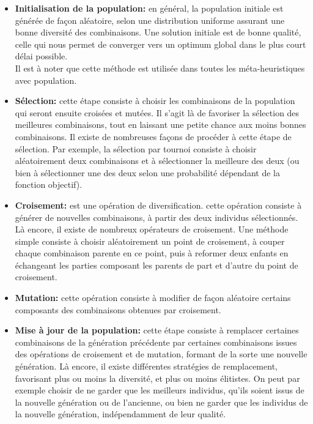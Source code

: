 \begin{enumerate}[label=\alph*)]
\begin{algorithm}[H]
\end{algorithm}

	
\begin{itemize}
	\item \textbf{Initialisation de la population: }en général, la population initiale est générée de façon aléatoire, selon une distribution uniforme assurant une bonne diversité des combinaisons. Une solution initiale est de bonne qualité, celle qui nous permet de converger vers un optimum global dans le plus court délai possible.\\
  Il est à noter que cette méthode est utilisée dans toutes les méta-heuristiques avec population.

	\item \textbf{Sélection: } cette étape consiste à choisir les combinaisons de la population qui seront ensuite croisées et mutées. Il s’agit là de favoriser la sélection des meilleures combinaisons, tout en laissant une petite chance aux moins bonnes combinaisons. Il existe de nombreuses façons de procéder à cette étape de sélection. Par exemple, la sélection par tournoi consiste à choisir aléatoirement deux combinaisons et à sélectionner la meilleure des deux (ou bien à sélectionner une des deux selon une probabilité dépendant de la fonction objectif).
	
	\item \textbf{Croisement:} est une opération de diversification. cette opération consiste à générer de nouvelles combinaisons, à partir des deux individus sélectionnés. Là encore, il existe de nombreux opérateurs de croisement. Une méthode simple consiste à choisir aléatoirement un point de croisement, à couper chaque combinaison parente en ce point, puis à reformer deux enfants en échangeant les parties composant les parents de part et d’autre du point de croisement.
	
	\item \textbf{Mutation: } cette opération consiste à modifier de façon aléatoire certains composants des combinaisons obtenues par croisement.
	
	\item \textbf{Mise à jour de la population: } cette étape consiste à remplacer certaines combinaisons de la génération précédente par certaines combinaisons issues des opérations de croisement et de mutation, formant de la sorte une nouvelle génération. Là encore, il existe différentes stratégies de remplacement, favorisant plus ou moins la diversité, et plus ou moins élitistes. On peut par exemple choisir de ne garder que les meilleurs individus, qu’ils soient issus de la nouvelle génération ou de l’ancienne, ou bien ne garder que les individus de la nouvelle génération, indépendamment de leur qualité.
	

\end{itemize}
\end{enumerate}

